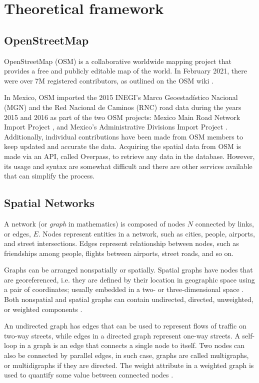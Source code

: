 \chapter{Theoretical framework}
\label{cha:chapter 2}

\section{OpenStreetMap}

OpenStreetMap (OSM) is a collaborative worldwide mapping project that provides a free and publicly editable map of the world. In February 2021, there were over 7M registered contributors, as outlined on the OSM wiki \cite{osm-wiki}.

In Mexico, OSM imported the 2015 INEGI's Marco Geoestadístico Nacional (MGN) and the Red Nacional de Caminos (RNC) road data during the years 2015 and 2016 as part of the two OSM projects: Mexico Main Road Network Import Project \cite{osm_RNC_project}, and Mexico's Administrative Divisions Import Project \cite{osm_MGN_project}. Additionally, individual contributions have been made from OSM members to keep updated and accurate the data.
Acquiring the spatial data from OSM is made via an API, called Overpass, to retrieve any data in the database. However, its usage and syntax are somewhat difficult and there are other services available that can simplify the process.

\section{Spatial Networks}
A network (or \textit{graph} in mathematics) is composed of nodes $N$ connected by links, or edges, $E$. Nodes represent entities in a network, such as cities, people, airports, and street intersections. Edges represent relationship between nodes, such as friendships among people, flights between airports, street roads, and so on. 

Graphs can be arranged nonspatially or spatially. Spatial graphs have nodes that are georeferenced, i.e. they are defined by their location in geographic space using a pair of coordinates; usually embedded in a two- or three-dimensional space \cite{barthelemy_spatial_2011}. Both nonspatial and spatial graphs can contain undirected, directed, unweighted, or weighted components \cite{anderson_2020}.

An undirected graph has edges that can be used to represent flows of traffic on two-way streets, while edges in a directed graph represent one-way streets. A self-loop in a graph is an edge that connects a single node to itself. Two nodes can also be connected by parallel edges, in such case, graphs are called multigraphs, or multidigraphs if they are directed. The weight attribute in a weighted graph is used to quantify some value between connected nodes \cite{boeing_osmnx_2017}.

